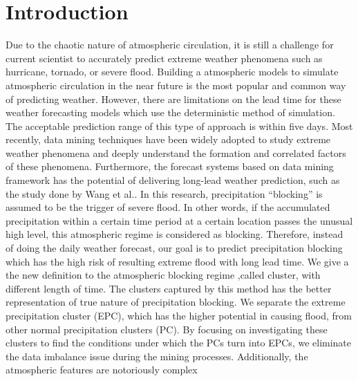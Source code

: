 \documentclass{acm_proc_article-sp}
\begin{document}


\section{Introduction}
\label{sec:intro}
Due to the chaotic nature of atmospheric circulation, it is still a challenge
for current scientist to accurately predict extreme weather phenomena such as
hurricane, tornado, or severe flood. Building a atmospheric
models to simulate atmospheric circulation in the near future is the most
popular and common way of predicting weather.\cite{cloke2009ensemble} However,
there are limitations on the lead time for these weather forecasting models which use the
deterministic method of simulation.\cite{lubchenco2012extreme} The acceptable prediction range of this type of approach is within five days.\cite{alfieri2012operational}
\newline Most recently, data mining techniques have been widely adopted to
study extreme weather phenomena and deeply understand the formation and
correlated factors of these phenomena.
\cite{li2008real} \cite{supinie2009spatiotemporal} \cite{mcgovern2011using}
 \cite{Wang:2013:TLF:2487575.2488220} Furthermore, the forecast systems based on
data mining framework has the potential of delivering long-lead weather
prediction, such as the study done by Wang et al.\cite{Wang:2013:TLF:2487575.2488220}.
\newline
 In this research, precipitation ``blocking'' is assumed to be the trigger of severe flood. In other words, if the accumulated precipitation within a certain time period at a certain location passes the unusual high level, this atmospheric regime is considered as
blocking. Therefore, instead of doing the daily weather forecast, our goal is to predict precipitation blocking which has the high risk of resulting extreme flood with long lead time. We give a the new definition to the atmospheric blocking regime ,called cluster, with different length of time. The clusters captured by this method has the better representation of true nature of precipitation blocking. We separate the extreme precipitation cluster (EPC), which has the higher potential in causing flood, from other normal precipitation clusters (PC). By focusing on investigating these clusters to find the conditions under which the PCs turn into EPCs, we eliminate the data imbalance issue during the mining processes.
\newline Additionally, the atmospheric features are notoriously complex
\end{document}
